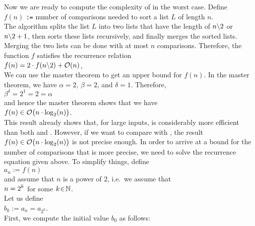\noindent
Now we are ready to compute the complexity of  in the worst case.  Define
\\[0.2cm]
\hspace*{1.3cm}
$f(n)$  \texttt{:=} number of comparisons needed to sort a list $L$ of length $n$.
\\[0.2cm]
The algorithm  
splits the list $L$ into two lists that have the length of $n\symbol{92}2$ or $n\symbol{92}2+1$, then sorts
these lists recursively, and finally merges the sorted lists.  Merging the two lists can be done with
at most $n$ comparisons.  Therefore, the function $f$ satisfies the recurrence relation
\\[0.2cm]
\hspace*{1.3cm}
$f(n) = 2 \cdot f(n \symbol{92} 2) + \Oh(n)$,
\\[0.2cm]
We can use the master theorem to get an upper bound for $f(n)$.  In the master theorem, we have
$\alpha = 2$, $\beta = 2$, and $\delta = 1$. Therefore,
\\[0.2cm]
\hspace*{1.3cm}
$\beta^\delta = 2^1 = 2 = \alpha$
\\[0.2cm]
and hence the master theorem shows that we have
\\[0.2cm]
\hspace*{1.3cm}
$f(n) \in \mathcal{O}\bigl(n \cdot \log_2(n) \bigr)$.
\\[0.2cm]
This result already shows that, for large inputs,  is considerably more efficient
than both  and .  However, if we want to compare
 with , the result $f(n) \in \mathcal{O}\bigl(n \cdot \log_2(n) \bigr)$ is
not precise enough.  In order to arrive at a bound for the number of comparisons that is more precise,
we need to solve the recurrence equation given above.  To simplify things,  define
\\[0.2cm]
\hspace*{1.3cm}
$a_n := f(n)$ 
\\[0.2cm]
and assume that $n$ is a power of $2$, i.e.~we assume that
\\[0.2cm]
\hspace*{1.3cm}
$\displaystyle n = 2^k$ \qquad for some $k \!\in\! \mathbb{N}$.
\\[0.2cm]
Let us define
\\[0.2cm]
\hspace*{1.3cm}
$b_k := a_n = a_{2^k}$.
\\[0.2cm]
First, we compute the initial value $b_0$ as follows:
